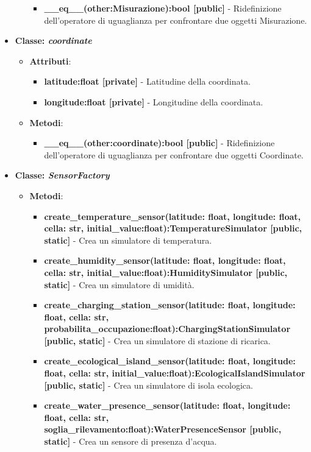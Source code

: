 \begin{itemize}
\begin{itemize}
\begin{itemize}
        \item \textbf{\_\_eq\_\_(other:Misurazione):bool [public]} - Ridefinizione dell'operatore di uguaglianza per confrontare due oggetti Misurazione.
    \end{itemize}
\end{itemize}
    \item{\textbf{Classe: \textit{coordinate}}}
    \begin{itemize}
        \item    \textbf{Attributi}: 
    \begin{itemize}
        \item \textbf{latitude:float [private]} - Latitudine della coordinata.
        \item \textbf{longitude:float [private]} - Longitudine della coordinata.
    \end{itemize}
    \item     \textbf{Metodi}: 
    \begin{itemize}
        \item \textbf{\_\_eq\_\_(other:coordinate):bool [public]} - Ridefinizione dell'operatore di uguaglianza per confrontare due oggetti Coordinate.
    \end{itemize}
\end{itemize}
    \item{\textbf{Classe: \textit{SensorFactory}}}
    \begin{itemize}
        \item    \textbf{Metodi}: 
\begin{itemize}
    \item \textbf{create\_temperature\_sensor(latitude: float, longitude: float, cella: str, initial\_value:float):TemperatureSimulator [public, static]} - Crea un simulatore di temperatura.
    \item \textbf{create\_humidity\_sensor(latitude: float, longitude: float, cella: str, initial\_value:float):HumiditySimulator [public, static]} - Crea un simulatore di umidità.
    \item \textbf{create\_charging\_station\_sensor(latitude: float, longitude: float, cella: str, probabilita\_occupazione:float):ChargingStationSimulator [public, static]} - Crea un simulatore di stazione di ricarica.
    \item \textbf{create\_ecological\_island\_sensor(latitude: float, longitude: float, cella: str, initial\_value:float):EcologicalIslandSimulator [public, static]} - Crea un simulatore di isola ecologica.
    \item \textbf{create\_water\_presence\_sensor(latitude: float, longitude: float, cella: str, soglia\_rilevamento:float):WaterPresenceSensor [public, static]} - Crea un sensore di presenza d'acqua.

\end{itemize}
\end{itemize}
\end{itemize}
